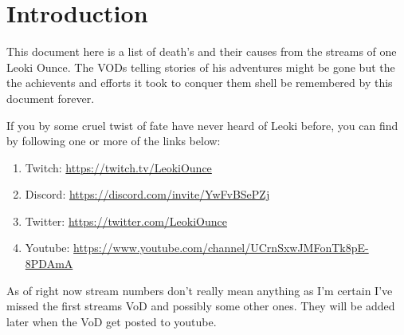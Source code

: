 \chapter*{Introduction}

This document here is a list of death's and their causes from the streams of one Leoki Ounce. The VODs telling stories of his adventures might be gone but the the achievents and efforts it took to conquer them shell be remembered by this document forever.

If you by some cruel twist of fate have never heard of Leoki before, you can find by following one or more of the links below:
\begin{enumerate}[label = \textbullet]
    \item Twitch: \href{https://twitch.tv/LeokiOunce}{https://twitch.tv/LeokiOunce}
    \item Discord: \href{https://discord.com/invite/YwFvBSePZj}{https://discord.com/invite/YwFvBSePZj}
    \item Twitter: \href{https://twitter.com/LeokiOunce}{https://twitter.com/LeokiOunce}
    \item Youtube: \href{https://www.youtube.com/channel/UCrnSxwJMFonTk8pE-8PDAmA}{https://www.youtube.com/channel/UCrnSxwJMFonTk8pE-8PDAmA}
\end{enumerate}

As of right now stream numbers don't really mean anything as I'm certain I've missed the first streams VoD and possibly some other ones. They will be added later when the VoD get posted to youtube.